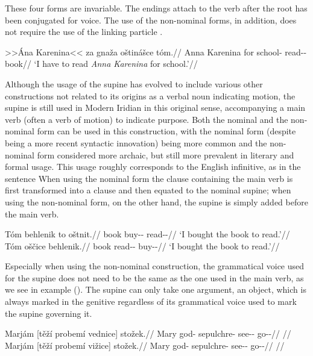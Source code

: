 These four forms are invariable. The endings attach to the verb after the root has been conjugated for voice. The use of the non-nominal forms, in addition, does not require the use of the linking particle .

\pex
\begingl
\gla >>Ána Karenina<< za gnaža oštinášce tóm.//
\glb Anna Karenina for school-\Acc{} read-\Pv{}-\SupN{} book//
\glft `I have to read \textit{Anna Karenina} for school.'//
\endgl
\xe

Although the usage of the supine has evolved to include various other constructions not related to its origins as a verbal noun indicating motion, the supine is still used in Modern Iridian in this original sense, accompanying a main verb (often a verb of motion) to indicate purpose. Both the nominal and the non-nominal form can be used in this construction, with the nominal form (despite being a more recent syntactic innovation) being more common and the non-nominal form considered more archaic, but still more prevalent in literary and formal usage. This usage roughly corresponds to the English infinitive, as in the sentence  When using the nominal form the clause containing the main verb is first transformed into a clause and then equated to the nominal supine; when using the non-nominal form, on the other hand, the supine is simply added before the main verb.

\pex
\a
\begingl
\gla Tóm behlenik to oštnit.//
\glb book buy-\Pv{}-\Pf{} \Rz{} read-\Pv{}-\SupP{}//
\glft `I bought the book to read.'//
\endgl
\a
\begingl
\gla Tóm oščice behlenik.//
\glb book read-\Av{}-\SupP{} buy-\Pv{}-\Pf{}//
\glft `I bought the book to read.'//
\endgl
\xe

Especially when using the non-nominal construction, the grammatical voice used for the supine does not need to be the same as the one used in the main verb, as we see in example (). The supine can only take one argument, an object, which is always marked in the genitive regardless of its grammatical voice used to mark the supine governing it.

\pex
\a\begingl
\gla Marjám [těží probem\'i vednice] stožek.//
\glb Mary god-\Gen{} sepulchre-\Gen{} see-\Pv{}-\SupP{} go-\Av{}-\Pf{}//
\glft {}//
\endgl
\a\begingl
\gla Marjám [těží probem\'i vi\v{z}ice] stožek.//
\glb Mary god-\Gen{} sepulchre-\Gen{} see-\Av{}-\SupP{} go-\Av{}-\Pf{}//
\glft {}//
\endgl
\xe

